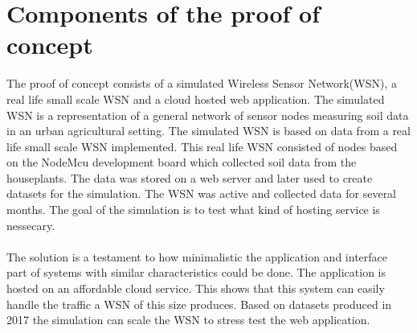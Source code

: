 \documentclass[]{uiophd}
\begin{document}
\section{Components of the proof of concept}
The proof of concept consists of a simulated Wireless Sensor Network(WSN), a real life small scale WSN and a cloud hosted web application. The simulated WSN is a representation of a general network of sensor nodes measuring soil data in an urban agricultural setting. The simulated WSN is based on data from a real life small scale WSN implemented. This real life WSN consisted of nodes based on the NodeMcu development board which collected soil data from the houseplants. The data was stored on a web server and later used to create datasets for the simulation. The WSN was active and collected data for several months. The goal of the simulation is to test what kind of hosting service is nessecary.
\\\\
The solution is a testament to how minimalistic the application and interface part of systems with similar characteristics could be done. The application is hosted on an affordable cloud service. This shows that this system can easily handle the traffic a WSN of this size produces. Based on datasets produced in 2017 the simulation can scale the WSN to stress test the web application.
\end{document}
